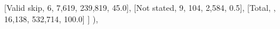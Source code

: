 \documentclass[
  11pt,
  a4paper,
]{article}
\newenvironment{Shaded}{\begin{snugshade}}{\end{snugshade}}
\newcommand{\NormalTok}[1]{\textcolor[rgb]{0.00,0.23,0.31}{#1}}
\newcommand{\StringTok}[1]{\textcolor[rgb]{0.13,0.47,0.30}{#1}}
\begin{document}
\begin{Shaded}
\begin{Highlighting}[]
\NormalTok{            [}\StringTok{\textquotesingle{}Valid skip\textquotesingle{}}\NormalTok{, }\StringTok{\textquotesingle{}6\textquotesingle{}}\NormalTok{, }\StringTok{\textquotesingle{}7,619\textquotesingle{}}\NormalTok{, }\StringTok{\textquotesingle{}239,819\textquotesingle{}}\NormalTok{, }\StringTok{\textquotesingle{}45.0\textquotesingle{}}\NormalTok{],}
\NormalTok{            [}\StringTok{\textquotesingle{}Not stated\textquotesingle{}}\NormalTok{, }\StringTok{\textquotesingle{}9\textquotesingle{}}\NormalTok{, }\StringTok{\textquotesingle{}104\textquotesingle{}}\NormalTok{, }\StringTok{\textquotesingle{}2,584\textquotesingle{}}\NormalTok{, }\StringTok{\textquotesingle{}0.5\textquotesingle{}}\NormalTok{],}
\NormalTok{            [}\StringTok{\textquotesingle{}Total\textquotesingle{}}\NormalTok{, }\StringTok{\textquotesingle{}\textquotesingle{}}\NormalTok{, }\StringTok{\textquotesingle{}16,138\textquotesingle{}}\NormalTok{, }\StringTok{\textquotesingle{}532,714\textquotesingle{}}\NormalTok{, }\StringTok{\textquotesingle{}100.0\textquotesingle{}}\NormalTok{]}
\NormalTok{        ]}
\NormalTok{    ),}


\end{Highlighting}
\end{Shaded}
\end{document}
